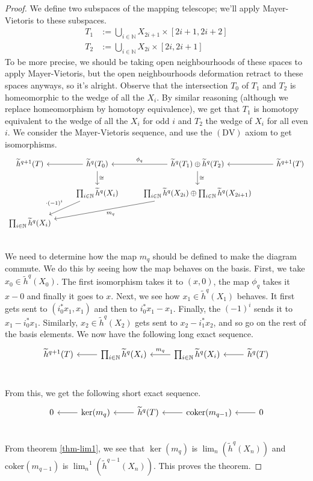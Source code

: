 \documentclass[12pt, notitlepage]{article}
\theoremstyle{definition}
\newcommand{\redco}{\widetilde{h}}
\newcommand{\coker}{\mathrm{coker}}
\begin{document}
\begin{proof}
  We define two subspaces of the mapping telescope; we'll apply Mayer-Vietoris to these subspaces.
  \begin{align*}
    T_1 &:= \bigcup_{i \in \mathbb{N}} X_{2i+1} \times [2i+1, 2i+2] \\
    T_2 &:= \bigcup_{i \in \mathbb{N}} X_{2i} \times [2i, 2i+1] 
  \end{align*}
  To be more precise, we should be taking open neighbourhoods of these spaces to apply
  Mayer-Vietoris, but the open neighbourhoods deformation retract to these spaces anyways, so it's
  alright.  Observe that the intersection $T_0$ of $T_1$ and $T_2$ is homeomorphic to the wedge of
  all the $X_i$.  By similar reasoning (although we replace homeomorphism by homotopy equivalence),
  we get that $T_1$ is homotopy equivalent to the wedge of all the $X_i$ for odd $i$ and $T_2$ the
  wedge of $X_i$ for all even $i$. We consider the Mayer-Vietoris sequence, and use the
  $(\mathrm{DV})$ axiom to get isomorphisms.
  \[
    \begin{tikzcd}
      \redco^{q+1}(T) & \redco^{q}(T_0) \ar[l] \ar[d, "\cong"] & \redco^{q}(T_1) \oplus \redco^{q}(T_2) \ar[l, swap, "\phi_q"] \ar[d, "\cong"] & \redco^{q+1}(T) \ar[l] \\
      & \prod_{i \in \mathbb{N}} \redco^{q}(X_i) \ar[dl, swap, "\cdot (-1)^i"] & \prod_{i \in \mathbb{N}} \redco^{q}(X_{2i}) \oplus \prod_{i \in \mathbb{N}} \redco^{q}(X_{2i+1}) \ar[dll, "m_q"] &   \\
      \prod_{i \in \mathbb{N}} \redco^{q}(X_i) & & & \\
    \end{tikzcd}
  \]
  We need to determine how the map $m_q$ should be defined to make the diagram commute.  We do this
  by seeing how the map behaves on the basis. First, we take $x_0 \in \redco^{q}(X_0)$. The first
  isomorphism takes it to $(x, 0)$, the map $\phi_q$ takes it $x-0$ and finally it goes to
  $x$. Next, we see how $x_1 \in \redco^{q}(X_1)$ behaves. It first gets sent to
  $(i_0^{\ast}x_1, x_1)$ and then to $i_0^{\ast}x_1 - x_1$.  Finally, the $(-1)^i$ sends it to
  $x_1 - i_0^{\ast}x_1$. Similarly, $x_2 \in \redco^{q}(X_2)$ gets sent to $x_2-i_1^{\ast}x_2$, and
  so go on the rest of the basis elements. We now have the following long exact sequence.
  \[
    \begin{tikzcd}
      \redco^{q+1}(T) & \prod_{i \in \mathbb{N}}\redco^{q} (X_i) \ar[l] & \prod_{i \in \mathbb{N}}\redco^{q} (X_i) \ar[swap, l, "m_q"] & \redco^{q}(T) \ar[l] \\
    \end{tikzcd}
  \]

  From this, we get the following short exact sequence.
  \[
    \begin{tikzcd}
      0 & \ker(m_q) \ar[l] & \redco^{q}(T) \ar[l] & \coker(m_{q-1}) \ar[l] & 0 \ar[l] \\
    \end{tikzcd}
  \]
  From theorem \ref{thm-lim1}, we see that $\ker(m_q)$ is $\lim_n(\redco^{q}(X_n))$ and
  $\coker(m_{q-1})$ is ${\lim_n}^1(\redco^{q-1}(X_n))$. This proves the theorem.

\end{proof}

%  
\end{document}
